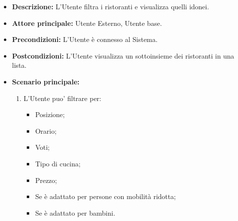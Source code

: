 \label{usecase:Filtro Ristoranti}
    \begin{itemize}
    \item \textbf{Descrizione:} L'Utente filtra i ristoranti e visualizza quelli idonei.

    \item \textbf{Attore principale:} Utente Esterno, Utente base.

    \item \textbf{Precondizioni:} L'Utente è connesso al Sistema.

    \item \textbf{Postcondizioni:} L'Utente visualizza un sottoinsieme dei ristoranti in una lista.

    \item \textbf{Scenario principale:}
    \begin{enumerate}
        \item L'Utente puo' filtrare per:
        \begin{itemize}
            \item Posizione;
            \item Orario;
            \item Voti;
            \item Tipo di cucina;
            \item Prezzo;
            \item Se è adattato per persone con mobilità ridotta;
            \item Se è adattato per bambini.
        \end{itemize}
    \end{enumerate}
\end{itemize}